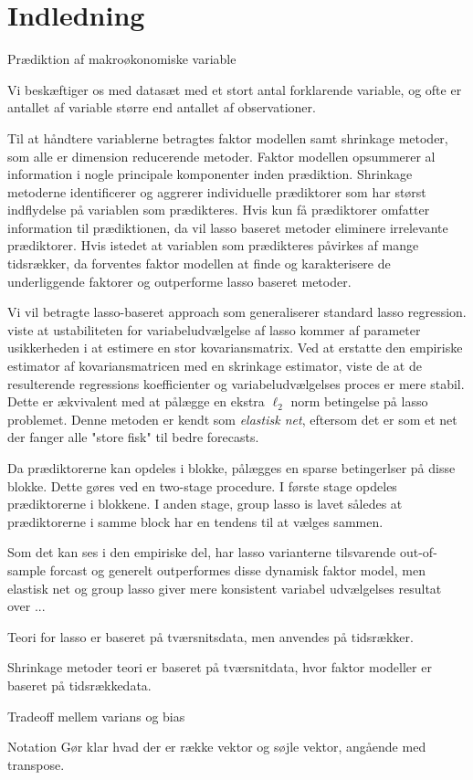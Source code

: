 \chapter{Indledning}
Prædiktion af makroøkonomiske variable 

Vi beskæftiger os med datasæt med et stort antal forklarende variable, og ofte er antallet af variable større end antallet af observationer.

Til at håndtere variablerne betragtes faktor modellen samt shrinkage metoder, som alle er dimension reducerende metoder.
Faktor modellen opsummerer al information i nogle principale komponenter inden prædiktion.
Shrinkage metoderne identificerer og aggrerer individuelle prædiktorer som har størst indflydelse på variablen som prædikteres.
Hvis kun få prædiktorer omfatter information til prædiktionen, da vil lasso baseret metoder eliminere irrelevante prædiktorer.
Hvis istedet at variablen som prædikteres påvirkes af mange tidsrækker, da forventes faktor modellen at finde og karakterisere de underliggende faktorer og outperforme lasso baseret metoder.


Vi vil betragte lasso-baseret approach som generaliserer standard lasso regression.
\citep{zou_hastie} viste at ustabiliteten for variabeludvælgelse af lasso kommer af parameter usikkerheden i at estimere en stor kovariansmatrix.
Ved at erstatte den empiriske estimator af kovariansmatricen med en skrinkage estimator, viste de at de resulterende regressions koefficienter og variabeludvælgelses proces er mere stabil.
Dette er ækvivalent med at pålægge en ekstra \(\ell_2\) norm betingelse på lasso problemet.
Denne metoden er kendt som \textit{elastisk net}, eftersom det er som et net der fanger alle "store fisk" til bedre forecasts.

Da prædiktorerne kan opdeles i blokke, pålægges en sparse betingerlser på disse blokke.
Dette gøres ved en two-stage procedure.
I første stage opdeles prædiktorerne i blokkene. I anden stage, group lasso \citep{group_lasso} is lavet således at prædiktorerne i samme block har en tendens til at vælges sammen.

Som det kan ses i den empiriske del, har lasso varianterne tilsvarende out-of-sample forcast og generelt outperformes disse dynamisk faktor model, men elastisk net og group lasso giver mere konsistent variabel udvælgelses resultat over ...


Teori for lasso er baseret på tværsnitsdata, men anvendes på tidsrækker.



Shrinkage metoder teori er baseret på tværsnitdata, hvor faktor modeller er baseret på tidsrækkedata. 


Tradeoff mellem varians og bias

Notation
Gør klar hvad der er række vektor og søjle vektor, angående med transpose.  
